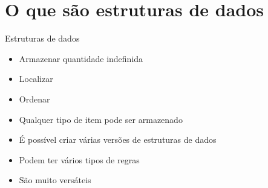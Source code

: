 \documentclass[14pt]{beamer}
\subtitle{Plante árvores}
\begin{document}
	
	\begin{frame}
		\titlepage
	\end{frame}

	\begin{frame}
		\tableofcontents
	\end{frame}

	\section{O que são estruturas de dados}
		\begin{frame}{Estruturas de dados}
			\begin{itemize}
				\presentationPause\item Armazenar quantidade indefinida
				\presentationPause\item Localizar
				\presentationPause\item Ordenar
				\presentationPause\item Qualquer tipo de item pode ser armazenado
				\presentationPause\item É possível criar várias versões de estruturas de dados
				\presentationPause\item Podem ter vários tipos de regras
				\presentationPause\item São muito versáteis
			\end{itemize}
		\end{frame}
\end{document}
